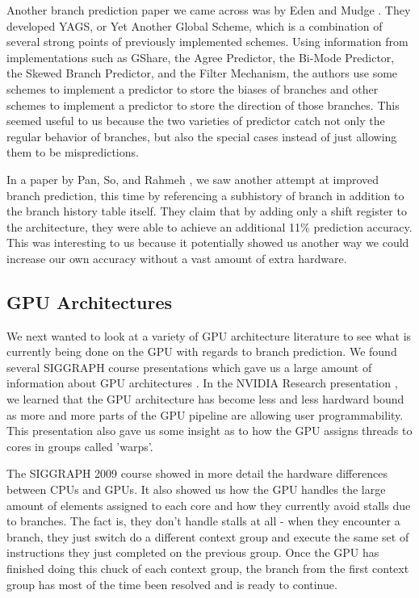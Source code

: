 \documentclass[conference]{IEEEtran}
\begin{document}
Another branch prediction paper we came across was by Eden and Mudge \cite{yags98}.  They developed YAGS, or Yet Another Global Scheme, which is a combination of several strong points of previously implemented schemes.  Using information from implementations such as GShare, the Agree Predictor, the Bi-Mode Predictor, the Skewed Branch Predictor, and the Filter Mechanism, the authors use some schemes to implement a predictor to store the biases of branches and other schemes to implement a predictor to store the direction of those branches.  This seemed useful to us because the two varieties of predictor catch not only the regular behavior of branches, but also the special cases instead of just allowing them to be mispredictions.

In a paper by Pan, So, and Rahmeh \cite{Pan92}, we saw another attempt at improved branch prediction, this time by referencing a subhistory of branch in addition to the branch history table itself.  They claim that by adding only a shift register to the architecture, they were able to achieve an additional 11\% prediction accuracy.  This was interesting to us because it potentially showed us another way we could increase our own accuracy without a vast amount of extra hardware.

\subsection{GPU Architectures}

We next wanted to look at a variety of GPU architecture literature to see what is currently being done on the GPU with regards to branch prediction.  We found several SIGGRAPH course presentations which gave us a large amount of information about GPU architectures \cite{Luebke08, Sig07, Sig09}.  In the NVIDIA Research presentation \cite{Luebke08}, we learned that the GPU architecture has become less and less hardward bound as more and more parts of the GPU pipeline are allowing user programmability.  This presentation also gave us some insight as to how the GPU assigns threads to cores in groups called 'warps'.

The SIGGRAPH 2009 course \cite{Sig09} showed in more detail the hardware differences between CPUs and GPUs.  It also showed us how the GPU handles the large amount of elements assigned to each core and how they currently avoid stalls due to branches.  The fact is, they don't handle stalls at all - when they encounter a branch, they just switch do a different context group and execute the same set of instructions they just completed on the previous group.  Once the GPU has finished doing this chuck of each context group, the branch from the first context group has most of the time been resolved and is ready to continue.
\end{document}
